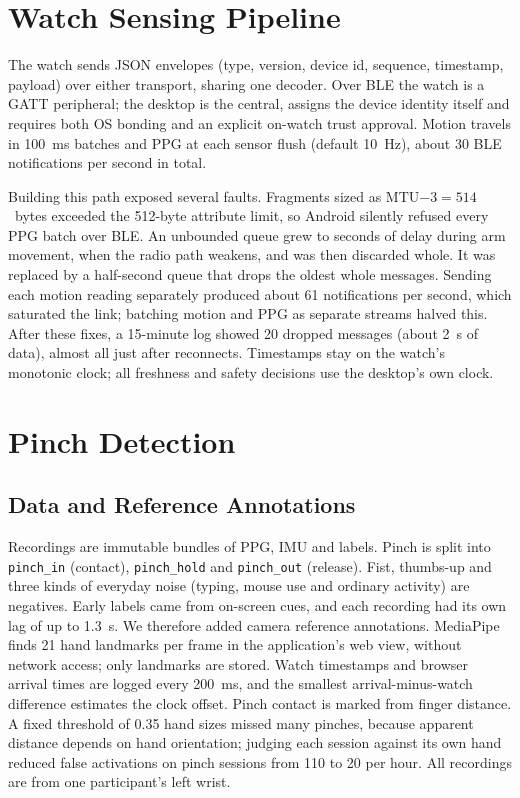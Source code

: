 \section{Watch Sensing Pipeline}

The watch sends JSON envelopes (type, version, device id, sequence, timestamp, payload) over either transport, sharing one decoder. Over BLE the watch is a GATT peripheral; the desktop is the central, assigns the device identity itself and requires both OS bonding and an explicit on-watch trust approval. Motion travels in 100~ms batches and PPG at each sensor flush (default 10~Hz), about 30 BLE notifications per second in total.

Building this path exposed several faults. Fragments sized as MTU$-3 = 514$~bytes exceeded the 512-byte attribute limit, so Android silently refused every PPG batch over BLE. An unbounded queue grew to seconds of delay during arm movement, when the radio path weakens, and was then discarded whole. It was replaced by a half-second queue that drops the oldest whole messages. Sending each motion reading separately produced about 61 notifications per second, which saturated the link; batching motion and PPG as separate streams halved this. After these fixes, a 15-minute log showed 20 dropped messages (about 2~s of data), almost all just after reconnects. Timestamps stay on the watch's monotonic clock; all freshness and safety decisions use the desktop's own clock.

\section{Pinch Detection}

\subsection{Data and Reference Annotations}

Recordings are immutable bundles of PPG, IMU and labels. Pinch is split into \texttt{pinch\_in} (contact), \texttt{pinch\_hold} and \texttt{pinch\_out} (release). Fist, thumbs-up and three kinds of everyday noise (typing, mouse use and ordinary activity) are negatives. Early labels came from on-screen cues, and each recording had its own lag of up to 1.3~s. We therefore added camera reference annotations. MediaPipe~\cite{mediapipe} finds 21 hand landmarks per frame in the application's web view, without network access; only landmarks are stored. Watch timestamps and browser arrival times are logged every 200~ms, and the smallest arrival-minus-watch difference estimates the clock offset. Pinch contact is marked from finger distance. A fixed threshold of 0.35 hand sizes missed many pinches, because apparent distance depends on hand orientation; judging each session against its own hand reduced false activations on pinch sessions from 110 to 20 per hour. All recordings are from one participant's left wrist.

